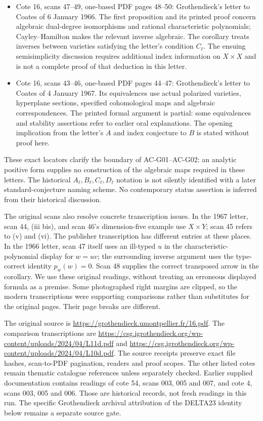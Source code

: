 \documentclass[11pt,a4paper]{article}
\theoremstyle{definition}
\theoremstyle{remark}
\begin{document}
\begin{itemize}
\item Cote 16, scans 47--49, one-based PDF pages 48--50:
Grothendieck's letter to Coates of 6 January 1966.
The first proposition and its printed proof concern algebraic
dual-degree isomorphisms and rational characteristic polynomials;
Cayley--Hamilton makes the relevant inverse algebraic.
The corollary treats inverses between varieties satisfying the
letter's condition $C_\ell$. The ensuing semisimplicity discussion
requires additional index information on $X\times X$ and is
not a complete proof of that deduction in this letter.
\item Cote 16, scans 43--46, one-based PDF pages 44--47:
Grothendieck's letter to Coates of 4 January 1967.
Its equivalences use actual polarized varieties, hyperplane
sections, specified cohomological maps and algebraic
correspondences. The printed formal argument is partial:
some equivalences and stability assertions refer to earlier
oral explanations. The opening implication from the letter's
$A$ and index conjecture to $B$ is stated without proof here.
\end{itemize}

These exact locators clarify the boundary of AC-G01--AC-G02:
an analytic positive form supplies no construction of the
algebraic maps required in these letters. The historical
$A_\ell,B_\ell,C_\ell,D_\ell$ notation is not silently identified
with a later standard-conjecture naming scheme. No contemporary
status assertion is inferred from their historical discussion.

The original scans also resolve concrete transcription issues.
In the 1967 letter, scan 44, (iii bis), and scan 46's
dimension-five example use $X\times Y$; scan 45 refers to
(v) and (vi). The publisher transcription has different entries
at these places. In the 1966 letter, scan 47 itself uses an
ill-typed $u$ in the characteristic-polynomial display for
$w=uv$; the surrounding inverse argument uses the type-correct
identity $p_w(w)=0$. Scan 48 supplies the correct transposed
arrow in the corollary. We use these original readings,
without treating an erroneous displayed formula as a premise.
Some photographed right margins are clipped, so the modern
transcriptions were supporting comparisons rather than substitutes
for the original pages. Their page breaks are different.

The original source is
\url{https://grothendieck.umontpellier.fr/16.pdf}.
The comparison transcriptions are
\url{https://csg.igrothendieck.org/wp-content/uploads/2024/04/L11d.pdf}
and
\url{https://csg.igrothendieck.org/wp-content/uploads/2024/04/L10d.pdf}.
The source receipts preserve exact file hashes, scan-to-PDF
pagination, readers and proof scopes. The other listed cotes
remain thematic catalogue references unless separately checked.
Earlier supplied documentation contains readings of cote 54,
scans 003, 005 and 007, and cote 4, scans 003, 005 and 006.
Those are historical records, not fresh readings in this run.
The specific Grothendieck archival attribution of the
DELTA23 identity below remains a separate source gate.
\end{document}
